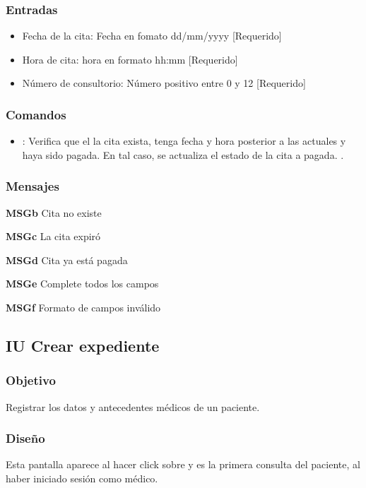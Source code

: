 \subsubsection{Entradas}
\begin{itemize}
	\item Fecha de la cita: Fecha en fomato dd/mm/yyyy [Requerido]
	\item Hora de cita: hora en formato hh:mm [Requerido]
	\item Número de consultorio: Número positivo entre 0 y 12 [Requerido]
\end{itemize} 

\subsubsection{Comandos}
\begin{itemize}
	\item {}:  Verifica que el la cita exista, tenga fecha y hora posterior a las actuales y haya sido pagada. En tal caso, se actualiza el estado de la cita a pagada.  .	
\end{itemize}

\subsubsection{Mensajes}
\begin{Citemize}
	\item {\bf MSGb} Cita no existe
	\item {\bf MSGc} La cita expiró
	\item {\bf MSGd} Cita ya está pagada
	\item {\bf MSGe} Complete todos los campos
	\item {\bf MSGf} Formato de campos inválido
\end{Citemize}

\subsection{IU Crear expediente}

\subsubsection{Objetivo}
Registrar los datos y antecedentes médicos de un paciente.

\subsubsection{Diseño}
Esta pantalla aparece al hacer click sobre  y es la primera consulta del paciente, al haber iniciado sesión como médico.


